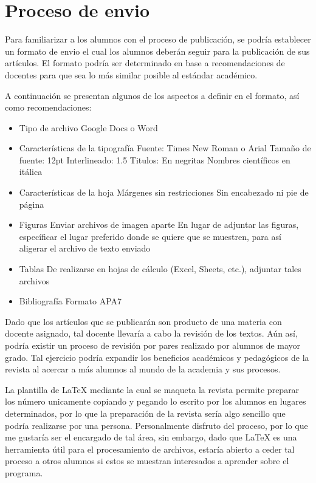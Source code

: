 \section{Proceso de envio}

Para familiarizar a los alumnos con el proceso de publicación, se podría establecer un formato de envio el cual los alumnos deberán seguir para la publicación de sus artículos. El formato podría ser determinado en base a recomendaciones de docentes para que sea lo más similar posible al estándar académico.

A continuación se presentan algunos de los aspectos a definir en el formato, así como recomendaciones:

\begin{itemize}
    \item Tipo de archivo
        \subitem Google Docs o Word
    \item Características de la tipografía
        \subitem Fuente: Times New Roman o Arial
        \subitem Tamaño de fuente: 12pt
        \subitem Interlineado: 1.5
        \subitem Titulos: En negritas
        \subitem Nombres científicos en itálica
    \item Características de la hoja
        \subitem Márgenes sin restricciones
        \subitem Sin encabezado ni pie de página
    \item Figuras
        \subitem Enviar archivos de imagen aparte
        \subitem En lugar de adjuntar las figuras, específicar el lugar preferido donde se quiere que se muestren, para así aligerar el archivo de texto enviado
    \item Tablas
        \subitem De realizarse en hojas de cálculo (Excel, Sheets, etc.), adjuntar tales archivos
    \item Bibliografía
        \subitem Formato APA7
\end{itemize}

Dado que los artículos que se publicarán son producto de una materia con docente asignado, tal docente llevaría a cabo la revisión de los textos. Aún así, podría existir un proceso de revisión por pares realizado por alumnos de mayor grado. Tal ejercicio podría expandir los beneficios académicos y pedagógicos de la revista al acercar a más alumnos al mundo de la academia y sus procesos.

La plantilla de LaTeX mediante la cual se maqueta la revista permite preparar los número unicamente copiando y pegando lo escrito por los alumnos en lugares determinados, por lo que la preparación de la revista sería algo sencillo que podría realizarse por una persona. Personalmente disfruto del proceso, por lo que me gustaría ser el encargado de tal área, sin embargo, dado que LaTeX es una herramienta útil para el procesamiento de archivos, estaría abierto a ceder tal proceso a otros alumnos si estos se muestran interesados a aprender sobre el programa. 

